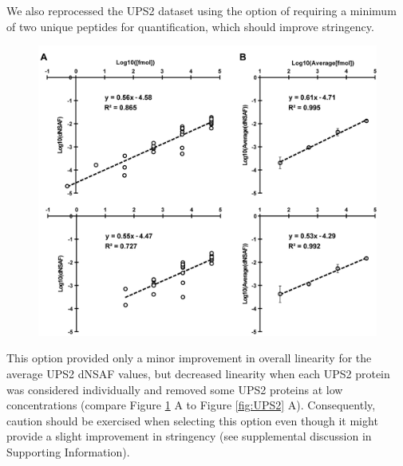 We also reprocessed the UPS2 dataset using the option of requiring a minimum of two unique peptides for quantification, which should improve stringency.
\begin{figure}[p]
	\centering
	\includegraphics[width=\columnwidth]{MSpC/figure2_supplemental.png}
	\label{fig:UPS2twopep}
\end{figure}
This option provided only a minor improvement in overall linearity for the average UPS2 dNSAF values, but decreased linearity when each UPS2 protein was considered individually and removed some UPS2 proteins at low concentrations (compare Figure \ref{fig:UPS2twopep} A to Figure \ref{fig:UPS2} A).
Consequently, caution should be exercised when selecting this option even though it might provide a slight improvement in stringency (see supplemental discussion in Supporting Information).
